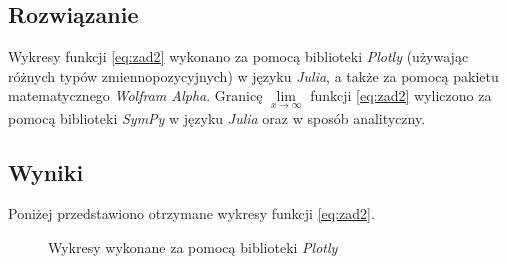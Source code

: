 \documentclass[11pt]{mk-polish-lab-report}
\begin{document}
\subsection{Rozwiązanie}

Wykresy funkcji \eqref{eq:zad2} wykonano za pomocą biblioteki \emph{Plotly} (używając różnych typów zmiennopozycyjnych) w języku \emph{Julia}, a także za pomocą pakietu matematycznego \emph{Wolfram Alpha}. Granicę $\mathop {\lim }\limits_{x \to \infty}$ funkcji \eqref{eq:zad2} wyliczono za pomocą biblioteki \emph{SymPy} w języku \emph{Julia} oraz w sposób analityczny.  

\subsection{Wyniki}
Poniżej przedstawiono otrzymane wykresy funkcji \eqref{eq:zad2}. 

\begin{figure}[h]
\centering
{}\hfill
{}\hfill
{}\hfill
\caption{Wykresy wykonane za pomocą biblioteki \emph{Plotly}} \label{fig:zad2-plotly}
\end{figure}
\end{document}
